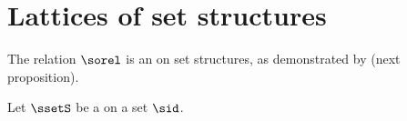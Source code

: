 \section{Lattices of set structures}

The  relation $\sorel$ 
is an  on set structures,
as demonstrated by  (next proposition).

\begin{definition}
\label{def:subset}
Let $\ssetS$ be a   on a set $\sid$.
\end{definition}


